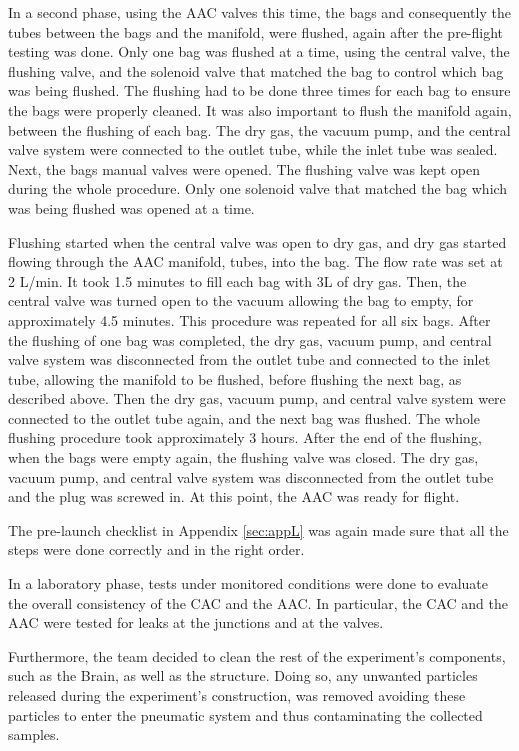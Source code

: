In a second phase, using the AAC valves this time, the bags and consequently the tubes between the bags and the manifold, were flushed, again after the pre-flight testing was done. Only one bag was flushed at a time, using the central valve, the flushing valve, and the solenoid valve that matched the bag to control which bag was being flushed. The flushing had to be done three times for each bag to ensure the bags were properly cleaned. It was also important to flush the manifold again, between the flushing of each bag. 
The dry gas, the vacuum pump, and the central valve system were connected to the outlet tube, while the inlet tube was sealed. Next, the bags manual valves were opened. The flushing valve was kept open during the whole procedure. Only one solenoid valve that matched the bag which was being flushed was opened at a time. 

Flushing started when the central valve was open to dry gas, and dry gas started flowing through the AAC manifold, tubes, into the bag. The flow rate was set at 2 L/min. It took 1.5 minutes to fill each bag with 3L of dry gas. Then, the central valve was turned open to the vacuum allowing the bag to empty, for approximately 4.5 minutes. This procedure was repeated for all six bags. After the flushing of one bag was completed, the dry gas, vacuum pump, and central valve system was disconnected from the outlet tube and connected to the inlet tube, allowing the manifold to be flushed, before flushing the next bag, as described above. Then the dry gas, vacuum pump, and central valve system were connected to the outlet tube again, and the next bag was flushed. The whole flushing procedure took approximately 3 hours. After the end of the flushing, when the bags were empty again, the flushing valve was closed. The dry gas, vacuum pump, and central valve system was disconnected from the outlet tube and the plug was screwed in. At this point, the AAC was ready for flight.   

The pre-launch checklist in Appendix \ref{sec:appL} was again made sure that all the steps were done correctly and in the right order. 

In a laboratory phase, tests under monitored conditions were done to evaluate the overall consistency of the CAC and the AAC. In particular, the CAC and the AAC were tested for leaks at the junctions and at the valves. 

Furthermore, the team decided to clean the rest of the experiment's components, such as the Brain, as well as the structure. Doing so, any unwanted particles released during the experiment's construction, was removed avoiding these particles to enter the pneumatic system and thus contaminating the collected samples. 

